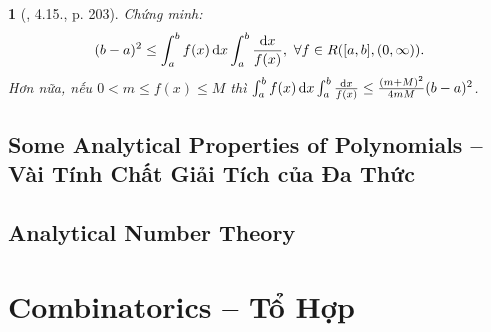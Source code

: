 \documentclass{article}
\newtheorem{baitoan}{}
\begin{document}
\begin{baitoan}[\cite{Quoc_Long_Dat_Nam_VMC}, 4.15., p. 203]
	Chứng minh:
	\begin{equation*}
		(b - a)^2\le\int_a^b f(x)\,{\rm d}x\int_a^b \frac{{\rm d}x}{f(x)},\ \forall f\in R([a,b],(0,\infty)).
	\end{equation*}
	Hơn nữa, nếu $0 < m\le f(x)\le M$ thì $\int_a^b f(x)\,{\rm d}x\int_a^b \frac{{\rm d}x}{f(x)}\le\frac{(m + M)^2}{4mM}(b - a)^2$.
\end{baitoan}


\subsection{Some Analytical Properties of Polynomials -- Vài Tính Chất Giải Tích của Đa Thức}


\subsection{Analytical Number Theory}


\section{Combinatorics -- Tổ Hợp}
\end{document}
